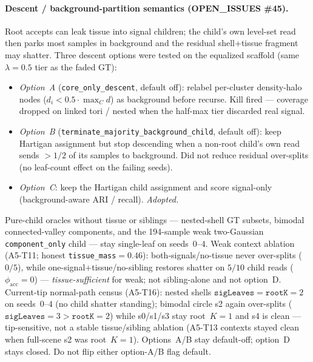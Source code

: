 \documentclass[11pt]{article}
\begin{document}
\paragraph{Descent / background-partition semantics (OPEN\_ISSUES \#45).}
Root accepts can leak tissue into signal children; the child's own
level-set read then parks most samples in background and the residual
shell{+}tissue fragment may shatter. Three descent options were tested
on the equalized scaffold (same $\lambda{=}0.5$ tier as the faded GT):
\begin{itemize}[leftmargin=1.5em]
  \item \emph{Option~A} (\texttt{core\_only\_descent}, default off):
    relabel per-cluster density-halo nodes
    ($d_i{<}0.5\cdot\max_C d$) as background before recurse. Kill fired
    --- coverage dropped on linked tori / nested when the half-max tier
    discarded real signal.
  \item \emph{Option~B}
    (\texttt{terminate\_majority\_background\_child}, default off): keep
    Hartigan assignment but stop descending when a non-root child's own
    read sends ${>}1/2$ of its samples to background. Did not reduce
    residual over-splits (no leaf-count effect on the failing seeds).
  \item \emph{Option~C}: keep the Hartigan child assignment and score
    signal-only (background-aware ARI / recall). \emph{Adopted.}
\end{itemize}
Pure-child oracles without tissue or siblings --- nested-shell GT
subsets, bimodal connected-valley components, and the 194-sample weak
two-Gaussian \texttt{component\_only} child --- stay single-leaf on
seeds~$0$--$4$. Weak context ablation (A5-T11; honest
\texttt{tissue\_mass}${}{=}0.46$): both-signals/no-tissue never
over-splits ($0/5$), while one-signal$+$tissue/no-sibling restores
shatter on $5/10$ child reads ($\phi_{\mathrm{acc}}{=}0$) ---
\emph{tissue-sufficient} for weak; not sibling-alone and not option~D.
Current-tip normal-path census (A5-T16): nested shells
$\texttt{sigLeaves}{=}\texttt{rootK}{=}2$ on seeds~$0$--$4$ (no
child shatter standing); bimodal circle s2 again over-splits
($\texttt{sigLeaves}{=}3{>}\texttt{rootK}{=}2$) while s0/s1/s3 stay
root~$K{=}1$ and s4 is clean --- tip-sensitive, not a stable
tissue/sibling ablation (A5-T13 contexts stayed clean when full-scene
s2 was root~$K{=}1$). Options~A/B stay default-off; option~D stays
closed. Do not flip either option-A/B flag default.
\end{document}
